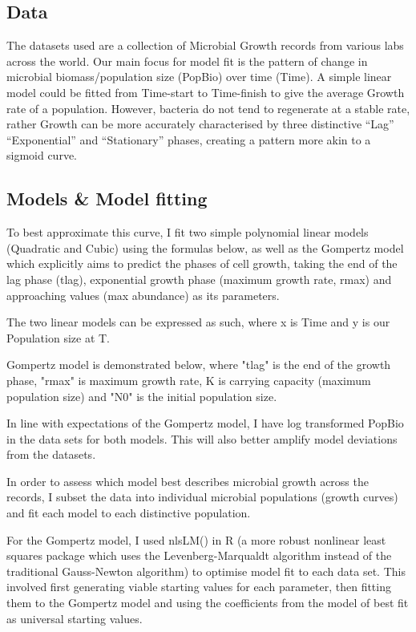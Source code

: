 \documentclass{article}
\begin{document}
        \subsection{Data}
        The datasets used are a collection of Microbial Growth records from various labs across the world. Our main focus for model fit is the pattern of change in microbial biomass/population size (PopBio) over time (Time). A simple linear model could be fitted from Time-start to Time-finish to give the average Growth rate of a population. However, bacteria do not tend to regenerate at a stable rate, rather Growth can be more accurately characterised by three distinctive “Lag” “Exponential” and “Stationary” phases, creating a pattern more akin to a sigmoid curve.
        
        \subsection{Models & Model fitting}
        To best approximate this curve, I fit two simple polynomial linear models (Quadratic and Cubic) using the formulas below, as well as the Gompertz model which explicitly aims to predict the phases of cell growth, taking the end of the lag phase (tlag), exponential growth phase (maximum growth rate, rmax)  and  approaching values (max abundance) as its parameters. 
        
        The two linear models can be expressed as such, where x is Time and y is our Population size at T.
        
        Gompertz model is demonstrated below, where "tlag" is the end of the growth phase, "rmax" is maximum growth rate, K is carrying capacity (maximum population size) and "N0" is the initial population size. 
        
        In line with expectations of the Gompertz model, I have log transformed PopBio in the data sets for both models. This will also better amplify model deviations from the datasets. 
        
        In order to assess which model best describes microbial growth across the records, I subset the data into individual microbial populations (growth curves) and fit each model to each distinctive population. 
        
        For the Gompertz model, I used nlsLM() in R (a more robust nonlinear least squares package which uses the Levenberg-Marqualdt algorithm instead of the traditional Gauss-Newton algorithm) to optimise model fit to each data set. This involved first generating viable starting values for each parameter, then fitting them to the Gompertz model and using the coefficients from the model of best fit as universal starting values. 
\end{document}
